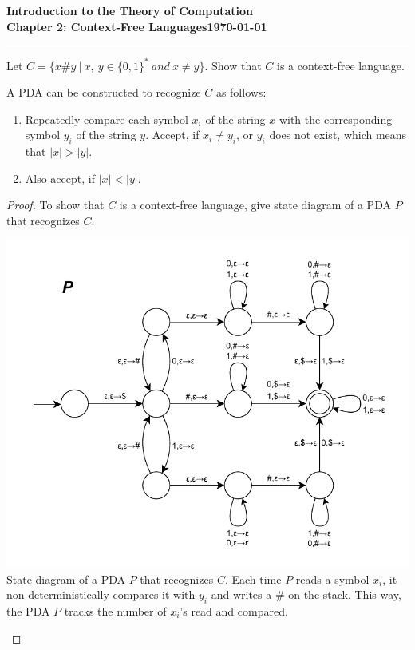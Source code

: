 \documentclass[11pt]{article}
\newcommand{\dated}{\today}
\begin{document}
\textbf{Introduction to the Theory of
Computation}\hfill\textbf{\myname}\\[0.01in]
\textbf{Chapter 2: Context-Free Languages}\hfill\textbf{\dated}\\
\smallskip\hrule\bigskip

\begin{problem}{2.22}
Let $C = \{x \# y \ | \ x, \ y \in \{0,1\}^{*} \ and \ x \neq y \}$. Show that $C$ is a context-free language.
\end{problem}

\begin{idea}
A PDA can be constructed to recognize $C$ as follows:
\begin{enumerate}
\item Repeatedly compare each symbol $x_{i}$ of the string $x$ with the corresponding symbol $y_{i}$ of the string $y$. Accept, if $x_{i} \neq y_{i}$, or $y_{i}$ does not exist, which means that $|x| > |y|$.
\item Also accept, if $|x| < |y|$.
\end{enumerate}
\end{idea}

\begin{proof}
To show that $C$ is a context-free language, give state diagram of a PDA $P$ that recognizes $C$.
\begin{center}
\includegraphics[scale=1.0]{Figures/Problem2.22.pdf} \\
State diagram of a PDA $P$ that recognizes $C$. Each time $P$ reads a symbol $x_{i}$, it non-deterministically compares it with $y_{i}$ and writes a $\#$ on the stack. This way, the PDA $P$ tracks the number of $x_{i}$'s read and compared.
\end{center}
\end{proof}
\end{document}
